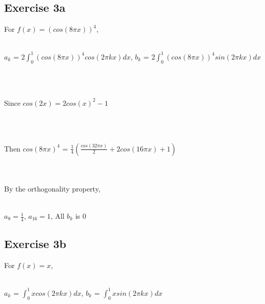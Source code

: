 \documentclass[11pt]{article} %
\begin{document}
\subsection{Exercise 3a}
For $f(x)=(cos(8\pi x))^{4}$, \\\\
\centerline{$a_{k}$ = $2\int_{0}^{1}(cos(8\pi x))^{4}cos(2\pi k x)dx$, $b_{k}$ = $2\int_{0}^{1}(cos(8\pi x))^{4}sin(2\pi k x)dx$}\\\\
\centerline{Since $cos(2x) = 2cos(x)^{2}-1$}\\\\
\centerline{Then $cos(8\pi x)^{4}$ = $\frac{1}{4}(\frac{cos(32\pi x)}{2}+2cos(16\pi x)+1)$}\\\\
By the orthogonality property,\\\\
\centerline{$a_{8} =\frac{1}{4}$, $a_{16} = 1$, All $b_{k}$ is 0}
\subsection{Exercise 3b}
For $f(x)=x$,\\\\
\centerline{$a_{k}$ = $\int_{0}^{1}xcos(2\pi k x)dx$, $b_{k}$ = $\int_{0}^{1}xsin(2\pi k x)dx$}\\\\
\end{document}
